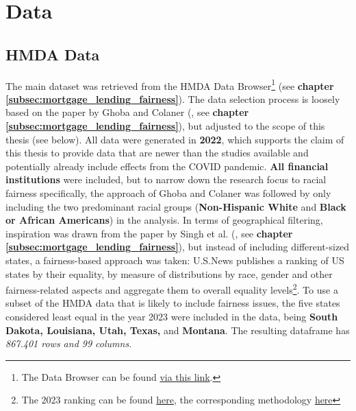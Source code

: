 \section{Data}\label{sec:Data}

\subsection{HMDA Data}\label{subsec:HMDA_Data}

The main dataset was retrieved from the HMDA Data Browser\footnote{The Data Browser can be found \href{https://ffiec.cfpb.gov/data-browser/data/2022?category=states}{via this link}.} (see \textbf{chapter \ref{subsec:mortgage_lending_fairness}}). 
The data selection process is loosely based on the paper by Ghoba and Colaner (\cite{Ghoba}, see \textbf{chapter \ref{subsec:mortgage_lending_fairness}}), but adjusted to the scope of this thesis (see below).
All data were generated in \textbf{2022}, which supports the claim of this thesis to provide data that are newer than the studies available and potentially already include effects from the COVID pandemic. 
\textbf{All financial institutions} were included, but to narrow down the research focus to racial fairness specifically, the approach of Ghoba and Colaner was followed by only including the two predominant racial groups (\textbf{Non-Hispanic White} and \textbf{Black or African Americans}) in the analysis. 
In terms of geographical filtering, inspiration was drawn from the paper by Singh et al. (\cite{Singh2022}, see \textbf{chapter \ref{subsec:mortgage_lending_fairness}}), but instead of including different-sized states, a fairness-based approach was taken: 
U.S.News publishes a ranking of US states by their equality, by measure of distributions by race, gender and other fairness-related aspects and aggregate them to overall equality levels\footnote{The 2023 ranking can be found \href{https://www.usnews.com/news/best-states/rankings/opportunity/equality?sort=rank-desc}{here}, the corresponding methodology \href{https://www.usnews.com/news/best-states/articles/methodology}{here}}. 
To use a subset of the HMDA data that is likely to include fairness issues, the five states considered least equal in the year 2023 were included in the data, being \textbf{South Dakota, Louisiana, Utah, Texas,} and \textbf{Montana}. The resulting dataframe has \textit{867.401 rows and 99 columns}.

